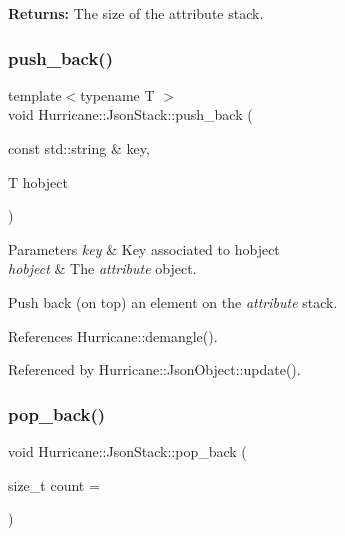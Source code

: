 {\bfseries Returns\+:} The size of the attribute stack. \mbox{\label{classHurricane_1_1JsonStack_a189a4e74a62f898f5fe903a185181bc5}} 
\subsubsection{\texorpdfstring{push\+\_\+back()}{push\_back()}}
{\footnotesize\ttfamily template$<$typename T $>$ \\
void Hurricane\+::\+Json\+Stack\+::push\+\_\+back (\begin{DoxyParamCaption}\item[{const std\+::string \&}]{key,  }\item[{T}]{hobject }\end{DoxyParamCaption})\hspace{0.3cm}{\ttfamily [inline]}}


\begin{DoxyParams}{Parameters}
{\em key} & Key associated to {\ttfamily hobject} \\
\hline
{\em hobject} & The {\itshape attribute} object.\\
\hline
\end{DoxyParams}
Push back (on top) an element on the {\itshape attribute} stack. 

References Hurricane\+::demangle().



Referenced by Hurricane\+::\+Json\+Object\+::update().

\mbox{\label{classHurricane_1_1JsonStack_a668d3c1974efefb6ced90544b4703fe5}} 
\subsubsection{\texorpdfstring{pop\+\_\+back()}{pop\_back()}}
{\footnotesize\ttfamily void Hurricane\+::\+Json\+Stack\+::pop\+\_\+back (\begin{DoxyParamCaption}\item[{size\+\_\+t}]{count = {} }\end{DoxyParamCaption})\hspace{0.3cm}{\ttfamily [inline]}}


